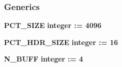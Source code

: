 \subsubsection*{Generics}
 \begin{DoxyCompactItemize}
\item 
{\bf P\+C\+T\+\_\+\+S\+I\+ZE} {\bfseries {\bfseries \textcolor{comment}{integer}\textcolor{vhdlchar}{ }\textcolor{vhdlchar}{ }\textcolor{vhdlchar}{\+:}\textcolor{vhdlchar}{=}\textcolor{vhdlchar}{ }\textcolor{vhdlchar}{ } \textcolor{vhdldigit}{4096} \textcolor{vhdlchar}{ }}}
\item 
{\bf P\+C\+T\+\_\+\+H\+D\+R\+\_\+\+S\+I\+ZE} {\bfseries {\bfseries \textcolor{comment}{integer}\textcolor{vhdlchar}{ }\textcolor{vhdlchar}{ }\textcolor{vhdlchar}{\+:}\textcolor{vhdlchar}{=}\textcolor{vhdlchar}{ }\textcolor{vhdlchar}{ } \textcolor{vhdldigit}{16} \textcolor{vhdlchar}{ }}}
\item 
{\bf N\+\_\+\+B\+U\+FF} {\bfseries {\bfseries \textcolor{comment}{integer}\textcolor{vhdlchar}{ }\textcolor{vhdlchar}{ }\textcolor{vhdlchar}{\+:}\textcolor{vhdlchar}{=}\textcolor{vhdlchar}{ }\textcolor{vhdlchar}{ } \textcolor{vhdldigit}{4} \textcolor{vhdlchar}{ }}}
\end{DoxyCompactItemize}

